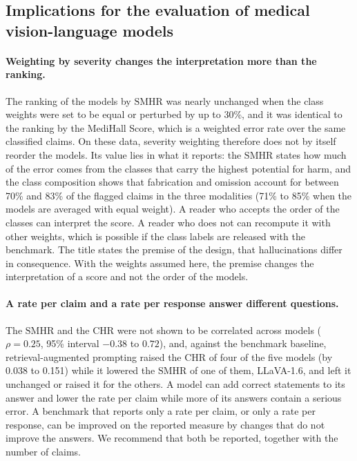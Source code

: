 \documentclass[11pt,a4paper]{article}
\newcommand{\SMHR}{\ensuremath{\mathrm{SMHR}}}
\newcommand{\CHR}{\ensuremath{\mathrm{CHR}}}
\begin{document}
\subsection{Implications for the evaluation of medical vision-language models}\label{sec:disc_eval}
\paragraph{Weighting by severity changes the interpretation more than the ranking.} The ranking of the models by \SMHR{} was nearly unchanged when the class weights were set to be equal or perturbed by up to 30\%, and it was identical to the ranking by the MediHall Score, which is a weighted error rate over the same classified claims. On these data, severity weighting therefore does not by itself reorder the models. Its value lies in what it reports: the \SMHR{} states how much of the error comes from the classes that carry the highest potential for harm, and the class composition shows that fabrication and omission account for between 70\% and 83\% of the flagged claims in the three modalities (71\% to 85\% when the models are averaged with equal weight). A reader who accepts the order of the classes can interpret the score. A reader who does not can recompute it with other weights, which is possible if the class labels are released with the benchmark. The title states the premise of the design, that hallucinations differ in consequence. With the weights assumed here, the premise changes the interpretation of a score and not the order of the models.

\paragraph{A rate per claim and a rate per response answer different questions.} The \SMHR{} and the \CHR{} were not shown to be correlated across models ($\rho = 0.25$, 95\% interval $-0.38$ to $0.72$), and, against the benchmark baseline, retrieval-augmented prompting raised the \CHR{} of four of the five models (by 0.038 to 0.151) while it lowered the \SMHR{} of one of them, LLaVA-1.6, and left it unchanged or raised it for the others. A model can add correct statements to its answer and lower the rate per claim while more of its answers contain a serious error. A benchmark that reports only a rate per claim, or only a rate per response, can be improved on the reported measure by changes that do not improve the answers. We recommend that both be reported, together with the number of claims.
\end{document}
